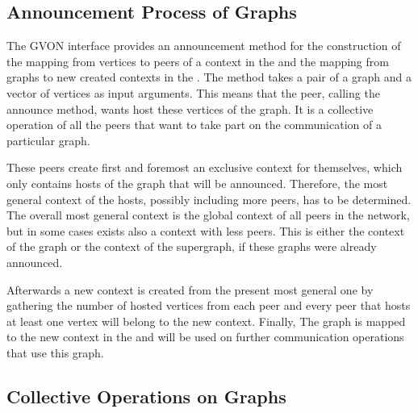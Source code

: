 \subsection{Announcement Process of Graphs}
\label{sec:announcement_impl}

The GVON interface provides an announcement method for the
construction of the mapping from vertices to peers of a context in the
 and the mapping from graphs to new created contexts in the
.  The method takes a pair of a graph and a vector of vertices
as input arguments. This means that the peer, calling the announce
method, wants host these vertices of the graph.  It is a collective
operation of all the peers that want to take part on the communication
of a particular graph.

These peers create first and foremost an exclusive context for
themselves, which only contains hosts of the graph that will be
announced.  Therefore, the most general context of the hosts, possibly
including more peers, has to be determined.  The overall most general
context is the global context of all peers in the network, but in some
cases exists also a context with less peers.  This is either the
context of the graph or the context of the supergraph, if these graphs
were already announced.

Afterwards a new context is created from the present most general one
by gathering the number of hosted vertices from each peer and every
peer that hosts at least one vertex will belong to the new context.
Finally, The graph is mapped to the new context in the  and
will be used on further communication operations that use this graph.


\subsection{Collective Operations on Graphs}
\label{sec:gvon_collective}

